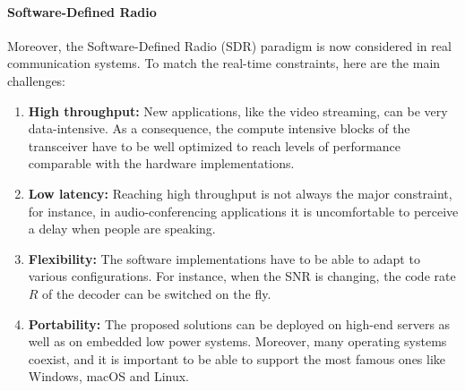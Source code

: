 \paragraph{Software-Defined Radio}

Moreover, the Software-Defined Radio (SDR) paradigm is now considered in real
communication systems. To match the real-time constraints, here are the main
challenges:

\begin{enumerate}
  \item \textbf{High throughput:} New applications, like the video streaming,
    can be very data-intensive. As a consequence, the compute intensive blocks
    of the transceiver have to be well optimized to reach levels of performance
    comparable with the hardware implementations.

  \item \textbf{Low latency:} Reaching high throughput is not always the major
    constraint, for instance, in audio-conferencing applications it is
    uncomfortable to perceive a delay when people are speaking.

  \item \textbf{Flexibility:} The software implementations have to be able to
    adapt to various configurations. For instance, when the SNR is changing,
    the code rate $R$ of the decoder can be switched on the fly.

  \item \textbf{Portability:} The proposed solutions can be deployed on high-end
    servers as well as on embedded low power systems. Moreover, many operating
    systems coexist, and it is important to be able to support the most famous
    ones like Windows, macOS and Linux.
\end{enumerate}
